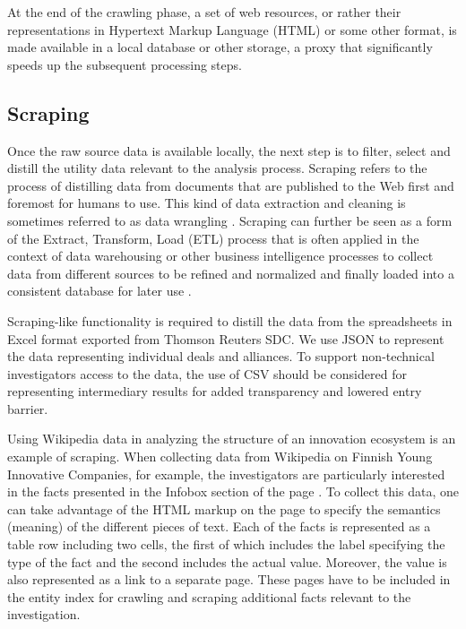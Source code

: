 At the end of the crawling phase, a set of web resources, or rather their representations in Hypertext Markup Language (HTML) or some other format, is made available in a local database or other storage, a proxy that significantly speeds up the subsequent processing steps.

\subsection{Scraping} 

Once the raw source data is available locally, the next step is to filter, select and distill the utility data relevant to the analysis process. Scraping refers to the process of distilling data from documents that are published to the Web first and foremost for humans to use. This kind of data extraction and cleaning is sometimes referred to as data wrangling \citep{Kandel2011}. Scraping can further be seen as a form of the Extract, Transform, Load (ETL) process that is often applied in the context of data warehousing or other business intelligence processes to collect data from different sources to be refined and normalized and finally loaded into a consistent database for later use \citep{Petschulat2010,Vassiliadis2009}. 

Scraping-like functionality is required to distill the data from the spreadsheets in Excel format exported from Thomson Reuters SDC. We use JSON to represent the data representing individual deals and alliances. To support non-technical investigators access to the data, the use of CSV should be considered for representing intermediary results for added transparency and lowered entry barrier.

Using Wikipedia data in analyzing the structure of an innovation ecosystem is an example of scraping. When collecting data from Wikipedia on Finnish Young Innovative Companies, for example, the investigators are particularly interested in the facts presented in the Infobox section of the page \citep[cf.][]{Huhtamaki2007CommunityEcosystem}. To collect this data, one can take advantage of the HTML markup on the page to specify the semantics (meaning) of the different pieces of text. Each of the facts is represented as a table row including two cells, the first of which includes the label specifying the type of the fact and the second includes the actual value. Moreover, the value is also represented as a link to a separate page. These pages have to be included in the entity index for crawling and scraping additional facts relevant to the investigation.

